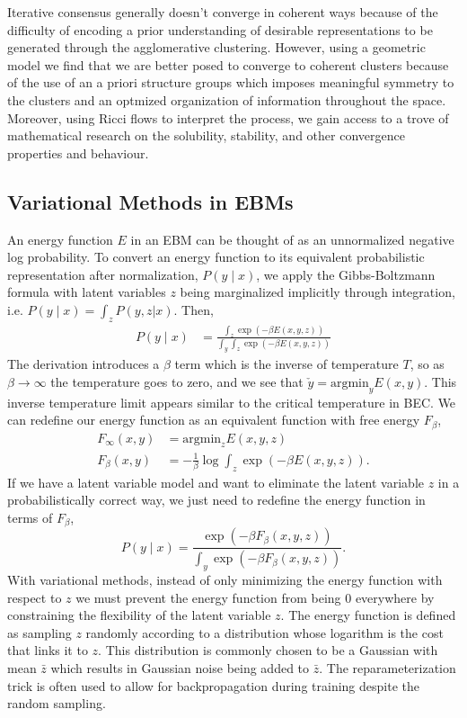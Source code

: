 \documentclass{article}
\begin{document}
    Iterative consensus generally doesn't converge in coherent ways because of the difficulty of encoding a prior understanding of desirable representations to be generated through the agglomerative clustering. However, using a geometric model we find that we are better posed to converge to coherent clusters because of the use of an a priori structure groups which imposes meaningful symmetry to the clusters and an optmized organization of information throughout the space. Moreover, using Ricci flows to interpret the process, we gain access to a trove of mathematical research on the solubility, stability, and other convergence properties and behaviour.
    
\subsection{Variational Methods in EBMs}
    An energy function $E$ in an EBM can be thought of as an unnormalized negative log probability. 
    To convert an energy function to its equivalent probabilistic representation after normalization,
    $P(y \mid x)$, we apply the Gibbs-Boltzmann formula with latent variables $z$ being marginalized implicitly through integration, i.e. $P(y \mid x) = \int_z P(y,z | x)$. Then,
    \begin{align*}
        P(y \mid x) &= \frac{ \int_z \exp(-\beta E(x,y,z)) }{ \int_y \int_z \exp(-\beta E(x, y, z))} 
    \end{align*}
    The derivation introduces a $\beta$ term which is the inverse of temperature $T$, so as $\beta \rightarrow \infty$ the temperature goes to zero, and we see that $\check{y} = \text{argmin}_{y} E(x,y)$. This inverse temperature limit appears similar to the critical temperature in BEC. We can redefine our energy function as an equivalent function with free energy $F_\beta$,
    \begin{align*}
        F_{\infty} (x,y) &= \text{argmin}_z E(x,y,z)\\
        F_{\beta} (x,y) &= -\frac{1}{\beta} \log \int_z \exp(-\beta E(x,y,z)).
    \end{align*}
    If we have a latent variable model and want to eliminate the latent variable $z$ in a probabilistically correct way, we just need to redefine the energy function in terms of $F_\beta$,
    \begin{equation}
         P(y \mid x) = \frac{ \exp(-\beta F_\beta(x,y,z)) }{ \int_y \exp(-\beta F_\beta(x, y, z))}.
    \end{equation}
    With variational methods, instead of only minimizing the energy function with respect to $z$ we must prevent the energy function from being 0 everywhere by constraining the flexibility of the latent variable $z$. The energy function is defined as sampling $z$ randomly according to a distribution whose logarithm is the cost that links it to $z$. This distribution is commonly chosen to be a Gaussian with mean $\bar z$ which results in Gaussian noise being added to $\bar z$. The reparameterization trick is often used to allow for backpropagation during training despite the random sampling.
\end{document}
